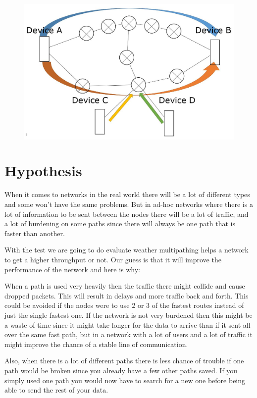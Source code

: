 \documentclass[11pt,twocolumn]{article}
\begin{document}
\begin{figure}[ht]
\begin{center}
\includegraphics[scale=0.26]{Figure_1}
\end{center}
\end{figure}


\section{Hypothesis}

When it comes to networks in the real world there will be a lot of different types and some won't have the same problems. But in ad-hoc networks where there is a lot of information to be sent between the nodes there will be a lot of traffic, and a lot of burdening on some paths since there will always be one path that is faster than another.

With the test we are going to do evaluate weather multipathing helps a network to get a higher throughput or not. Our guess is that it will improve the performance of the network and here is why:

When a path is used very heavily then the traffic there might collide and cause dropped packets. This will result in delays and more traffic back and forth. This could be avoided if the nodes were to use 2 or 3 of the fastest routes instead of just the single fastest one. If the network is not very burdened then this might be a waste of time since it might take longer for the data to arrive than if it sent all over the same fast path, but in a network with a lot of users and a lot of traffic it might improve the chance of a stable line of communication.

Also, when there is a lot of different paths there is less chance of trouble if one path would be broken since you already have a few other paths saved. If you simply used one path you would now have to search for a new one before being able to send the rest of your data.
\end{document}
